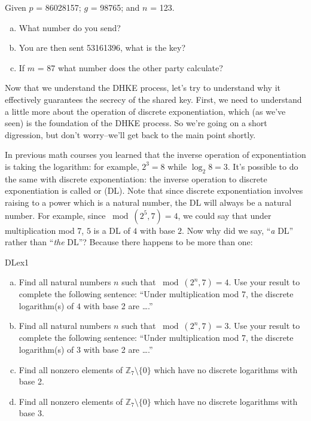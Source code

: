 \begin{exer}
Given $p$ = 86028157; $g$ = 98765; and $n$ = 123.  
\begin{enumerate}[(a)]
\item	What number do you send?  

\item You are then sent 53161396, what is the key? 

\item If $m$ = 87 what number does the other party calculate?
\end{enumerate}
\end{exer}
Now that we understand the DHKE process, let's try to understand why it effectively guarantees the secrecy of the shared key. First, we need to understand a little more about the operation of discrete exponentiation, which (as we've seen) is the foundation of the DHKE process. So we're going on a short digression, but don't worry--we'll get back to the main point shortly. 

In previous math courses you learned that the inverse operation of exponentiation is taking the logarithm: for example, $2^3 = 8$ while $\log_{2}8 = 3$.  It's possible to do the same with discrete exponentiation: the inverse operation to discrete exponentiation is  called  or (DL). Note that since discrete exponentiation involves raising to a power which is a natural number, the DL will always be a natural number.   For example, since $\bmod(2^5,7)=4$, we could say that under multiplication mod 7,  $5$ is a DL  of $4$ with base $2$. Now why did we say, ``\emph{a} DL'' rather than ``\emph{the} DL''? Because  there happens to be more than one:

\begin{exercise}{DLex1}
\begin{enumerate}[(a)]
\item
Find all natural numbers $n$ such that $\bmod(2^n,7)=4$.  Use your result to complete the following sentence: ``Under multiplication mod 7, the discrete logarithm(s) of $4$ with base 2  are \ldots.''
\item
Find all natural numbers $n$ such that $\bmod(2^n,7)=3$.  Use your result to complete the following sentence:  ``Under multiplication mod 7, the discrete logarithm(s) of $3$ with base 2 are \ldots.''
\item
Find all nonzero elements of $\mathbb{Z}_7 \setminus \{0\}$ which have no discrete logarithms with base 2.
\item
Find all nonzero elements of $\mathbb{Z}_7 \setminus \{0\}$ which have no discrete logarithms with base 3.
\end{enumerate}
\end{exercise}

